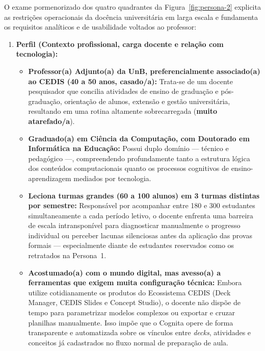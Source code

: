 O exame pormenorizado dos quatro quadrantes da Figura~\ref{fig:persona-2} explicita as restrições operacionais da docência universitária em larga escala e fundamenta os requisitos analíticos e de usabilidade voltados ao professor:

\begin{enumerate}
    \item \textbf{Perfil (Contexto profissional, carga docente e relação com tecnologia):}
    \begin{itemize}
        \item \textbf{Professor(a) Adjunto(a) da UnB, preferencialmente associado(a) ao CEDIS (40 a 50 anos, casado/a):} Trata-se de um docente pesquisador que concilia atividades de ensino de graduação e pós-graduação, orientação de alunos, extensão e gestão universitária, resultando em uma rotina altamente sobrecarregada (\textbf{muito atarefado/a}).
        \item \textbf{Graduado(a) em Ciência da Computação, com Doutorado em Informática na Educação:} Possui duplo domínio — técnico e pedagógico —, compreendendo profundamente tanto a estrutura lógica dos conteúdos computacionais quanto os processos cognitivos de ensino-aprendizagem mediados por tecnologia.
        \item \textbf{Leciona turmas grandes (60 a 100 alunos) em 3 turmas distintas por semestre:} Responsável por acompanhar entre 180 e 300 estudantes simultaneamente a cada período letivo, o docente enfrenta uma barreira de escala intransponível para diagnosticar manualmente o progresso individual ou perceber lacunas silenciosas antes da aplicação das provas formais — especialmente diante de estudantes reservados como os retratados na Persona~1.
        \item \textbf{Acostumado(a) com o mundo digital, mas avesso(a) a ferramentas que exigem muita configuração técnica:} Embora utilize cotidianamente os produtos do Ecossistema CEDIS (Deck Manager, CEDIS Slides e Concept Studio), o docente não dispõe de tempo para parametrizar modelos complexos ou exportar e cruzar planilhas manualmente. Isso impõe que o Cognita opere de forma transparente e automatizada sobre os vínculos entre \textit{decks}, atividades e conceitos já cadastrados no fluxo normal de preparação de aula.
    \end{itemize}


\end{enumerate}
